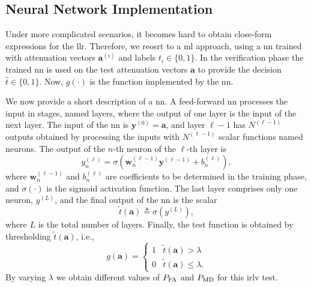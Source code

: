 \documentclass[conference,final]{IEEEtran}
\begin{document}

\subsection{Neural Network Implementation}\label{sec:nn}

Under more complicated scenarios, it becomes hard to obtain close-form expressions for the \ac{llr}. Therefore, we reosrt to a \ac{ml} approach, using a \ac{nn}  trained with attenuation vectors $\bm{a}^{(i)}$ and labels $t_i \in \{0,1\}$. In the verification phase the trained \ac{nn} is used on the test attenuation vectors $\bm a$ to provide the decision $\hat{t} \in \{0,1\}$. Now, $g(\cdot)$ is the function implemented by the \ac{nn}.

We now provide a short description of a \ac{nn}. A feed-forward \ac{nn} processes the input in stages, named layers, where the output of one layer is the input of the next layer. The input of the \ac{nn} is $\bm{y}^{(0)} = \bm{a}$, and layer $\ell-1$ has $N^{(\ell-1)}$ outputs obtained by processing the inputs with $N^{(\ell-1)}$ scalar functions named neurons. The output of the $n$-th neuron of the $\ell$-th layer is
\begin{equation}\label{eq:nonLin}
y_n^{(\ell)} = \sigma\left( \bm{w}_n^{(\ell -1)}\bm{y}^{(\ell-1)}+b_n^{(\ell)} \right),
\end{equation}
where $\bm{w}_n^{(\ell -1)}$ and $b_n^{(\ell)}$ are coefficients to be determined in the training phase, and $\sigma(\cdot)$ is the sigmoid activation function. 
The last layer comprises only one neuron, $y^{(L)}$, and the final output of the \ac{nn} is the scalar 
\begin{equation}
	\tilde{t}(\bm a) \triangleq \sigma(y^{(L)}),	
\end{equation}
where $L$ is the total number of layers. Finally, the test function is obtained by thresholding $\tilde{t}(\bm{a})$, i.e.,
\begin{equation}
\label{eq:decNN}
    g(\bm{a}) = \begin{cases}
    1 & \tilde{t}(\bm a) > \lambda \\
    0 & \tilde{t}(\bm a) \leq \lambda.
    \end{cases}
\end{equation}
By varying $\lambda$ we obtain different values of $P_{\rm FA}$ and $P_{\rm MD}$ for this \ac{irlv} test.
\end{document}
